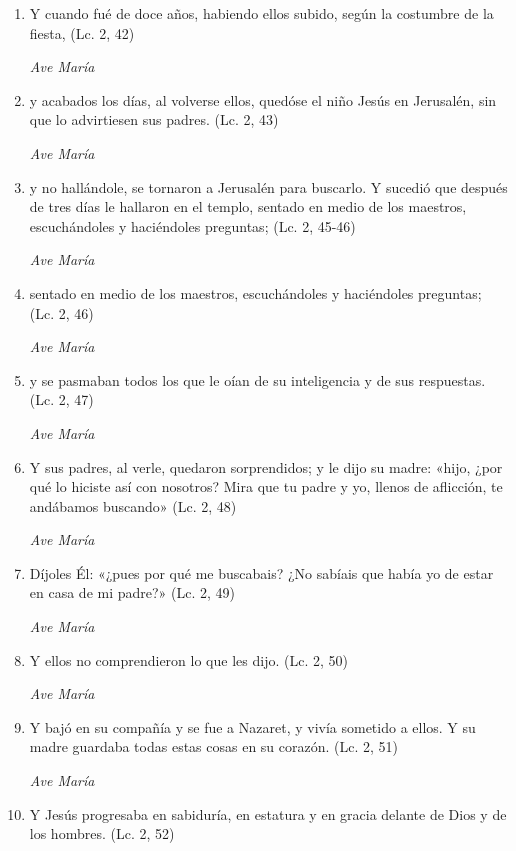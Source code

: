 \documentclass[a4paper,11pt, oneside]{report}
\begin{document}
      \begin{enumerate}

        \item Y cuando fué de doce años, habiendo ellos subido, según la costumbre de la fiesta, (Lc. 2, 42)
        
        \textit{Ave María}

        \item y acabados los días, al volverse ellos, quedóse el niño Jesús en Jerusalén, sin que lo advirtiesen sus padres. (Lc. 2, 43)
        
        \textit{Ave María}

        \item y no hallándole, se tornaron a Jerusalén para buscarlo. Y sucedió que después de tres días le hallaron en el templo,
        sentado en medio de los maestros, escuchándoles y haciéndoles preguntas; (Lc. 2, 45-46)
        
        \textit{Ave María}

        \item sentado en medio de los maestros, escuchándoles y haciéndoles preguntas; (Lc. 2, 46)
        
        \textit{Ave María}

        \item y se pasmaban todos los que le oían de su inteligencia y de sus respuestas. (Lc. 2, 47)

        \textit{Ave María}

        \item Y sus padres, al verle, quedaron sorprendidos; y le dijo su madre: «hijo, ¿por qué lo hiciste así con nosotros? Mira que tu padre
        y yo, llenos de aflicción, te andábamos buscando» (Lc. 2, 48)
        
        \textit{Ave María}

        \item Díjoles Él: «¿pues por qué me buscabais? ¿No sabíais que había yo de estar en casa de mi padre?» (Lc. 2, 49)
        
        \textit{Ave María}

        \item Y ellos no comprendieron lo que les dijo. (Lc. 2, 50)
        
        \textit{Ave María}

        \item Y bajó en su compañía y se fue a Nazaret, y vivía sometido a ellos. Y su madre guardaba todas estas
        cosas en su corazón. (Lc. 2, 51)
        
        \textit{Ave María}

        \item Y Jesús progresaba en sabiduría, en estatura y en gracia delante de Dios y de los hombres. (Lc. 2, 52)

      \end{enumerate}
\end{document}
